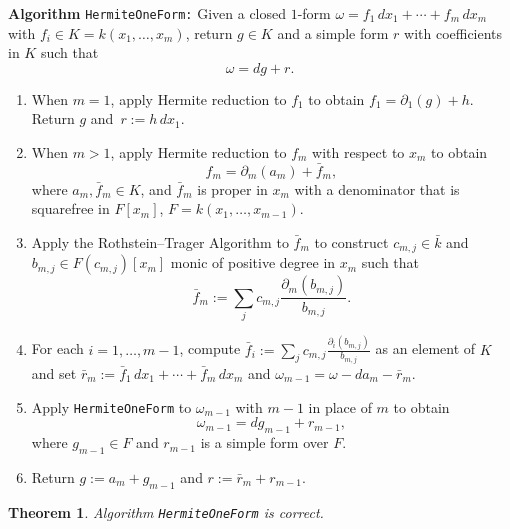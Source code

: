 \documentclass{amsart}
\newtheorem{thm}{Theorem}
\theoremstyle{definition}
\numberwithin{equation}{section}
\numberwithin{thm}{section}
\begin{document}
\medskip
\noindent
\textbf{Algorithm} \texttt{HermiteOneForm:}
	Given a closed $1$-form $\omega = f_1\, dx_1 + \cdots + f_m\, dx_m$ with $f_i \in K = k(x_1,\dots,x_m)$, return $g \in K$ and a simple form $r$ with coefficients in $K$ such that
\[\omega = dg + r.\]
\begin{enumerate}
\item When $m=1$, apply Hermite reduction to $f_1$ to obtain $f_1 = \partial_1(g) + h$. Return $g$ and~$r := h\, dx_1$.
\item When $m>1$, apply Hermite reduction to $f_m$ with respect to $x_m$ to obtain
\[f_m = \partial_m(a_m) + \bar{f}_m, \]
where $a_m, \bar{f}_m \in K$, and $\bar{f}_m$ is proper in $x_m$ with a denominator that is squarefree in $F[x_m]$, $F =k(x_1,\dots,x_{m-1})$.
\item Apply the Rothstein--Trager Algorithm to $\bar f_m$ to construct  $c_{m,j} \in \bar k$ and $b_{m, j} \in F(c_{m,j})[x_m]$ monic of positive degree in $x_m$ such that 
\[\bar{f}_m := \sum_j c_{m, j} \frac{\partial_m(b_{m, j})}{b_{m,j}}.\]
\item For each $i=1,\dots,m-1$, compute  $\bar f_i := \sum_j c_{m, j} \frac{\partial_i(b_{m, j})}{b_{m,j}}$ as an element of $K$ and set  $\bar r_m := \bar f_1\,dx_1 + \cdots + \bar f_{m}\,dx_{m}$ and $\omega_{m-1} = \omega - da_m - \bar r_m$. 
\item Apply \texttt{HermiteOneForm} to ${\omega}_{m-1}$ with $m-1$ in place of $m$ to obtain
\[{\omega}_{m-1}  = dg_{m-1}+ r_{m-1},\]
where $g_{m-1}\in F$ and $r_{m-1}$ is a simple form over $F$.
\item 
Return $g := a_m+g_{m-1}$ and $r := \bar{r}_m + r_{m-1}$.
\end{enumerate}

\begin{thm}
Algorithm {\tt HermiteOneForm} is correct.
\end{thm}
\end{document}

